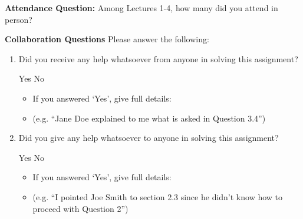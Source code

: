 \documentclass[11pt,addpoints,answers]{exam}
\numberwithin{equation}{section} %
\numberwithin{figure}{section} %
\numberwithin{table}{section} %
\begin{document}
\clearpage
\textbf{Attendance Question:} Among Lectures 1-4, how many did you attend in person?

\begin{tcolorbox}[fit,height=1cm,blank, borderline={1pt}{-2pt},nobeforeafter]
\end{tcolorbox}

    
\textbf{Collaboration Questions} Please answer the following:

\begin{enumerate}
    \item Did you receive any help whatsoever from anyone in solving this assignment?
    \begin{checkboxes}
     \choice Yes
     \choice No
    \end{checkboxes}
    \begin{itemize}
        \item If you answered `Yes', give full details:
        \item (e.g. “Jane Doe explained to me what is asked in Question 3.4”)
    \end{itemize}

    \begin{tcolorbox}[fit,height=3cm,blank, borderline={1pt}{-2pt},nobeforeafter]
    \end{tcolorbox}

    \item Did you give any help whatsoever to anyone in solving this assignment?
    \begin{checkboxes}
     \choice Yes
     \choice No
    \end{checkboxes}
    \begin{itemize}
        \item If you answered `Yes', give full details:
        \item (e.g. “I pointed Joe Smith to section 2.3 since he didn’t know how to proceed with Question 2”)
    \end{itemize}

    \begin{tcolorbox}[fit,height=3cm,blank, borderline={1pt}{-2pt},nobeforeafter]
    \end{tcolorbox}


\end{enumerate}
\end{document}
